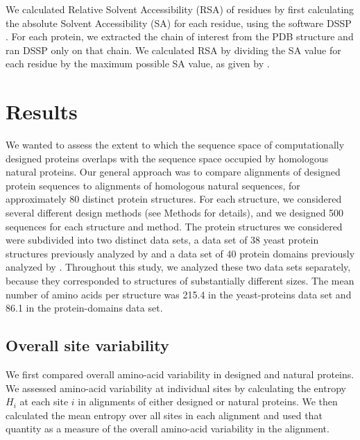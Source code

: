 \documentclass[12pt]{article}
\begin{document}
We calculated Relative Solvent Accessibility (RSA) of residues by first calculating the absolute Solvent Accessibility (SA) for each residue, using the software DSSP \citep{Kabsch1983}. For each protein, we extracted the chain of interest from the PDB structure and ran DSSP only on that chain. We calculated RSA by dividing the SA value for each residue by the maximum possible SA value, as given by \citet{Tien}. 

\section{Results}
\label{Results}


We wanted to assess the extent to which the sequence space of computationally designed proteins overlaps with the sequence space occupied by homologous natural proteins. Our general approach was to compare alignments of designed protein sequences to alignments of homologous natural sequences, for approximately 80 distinct protein structures. For each structure, we considered several different design methods (see Methods for details), and we designed 500 sequences for each structure and method. The protein structures we considered were subdivided into two distinct data sets, a data set of 38 yeast protein structures previously analyzed by \citet{Ramsey2011} and a data set of 40 protein domains previously analyzed by \citet{OllikainenKortemme}. Throughout this study, we analyzed these two data sets separately, because they corresponded to structures of substantially different sizes. The mean number of amino acids per structure was 215.4 in the yeast-proteins data set and 86.1 in the protein-domains data set.

\subsection{Overall site variability}
\label{SiteVariability}

We first compared overall amino-acid variability in designed and natural proteins. We assessed amino-acid variability at individual sites by calculating the entropy $H_i$ at each site $i$ in alignments of either designed or natural proteins. We then calculated the mean entropy over all sites in each alignment and used that quantity as a measure of the overall amino-acid variability in the alignment.
\end{document}
